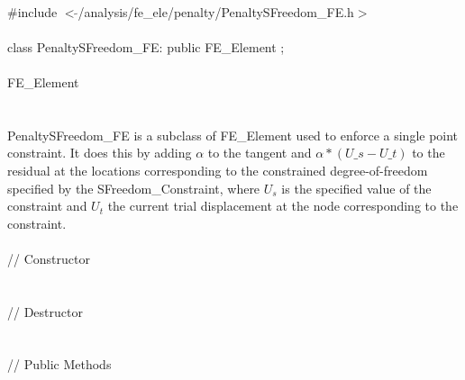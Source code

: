 
   \\
\indent \#include $<\tilde{ }$/analysis/fe\_ele/penalty/PenaltySFreedom\_FE.h$>$  \\

  \\
\indent class PenaltySFreedom\_FE: public FE\_Element ;  \\

  \\
\indent FE\_Element \\
\indent{} \\ 

  \\
\indent PenaltySFreedom\_FE is a subclass of FE\_Element used to enforce a
single point constraint. It does this by adding $\alpha$ to the
tangent and $\alpha * (U\_s - U\_t)$ to the residual at the locations
corresponding to the constrained degree-of-freedom specified by the
SFreedom\_Constraint, where $U_s$ is the specified value of the constraint
and $U_t$ the current trial displacement at the node corresponding to
the constraint.\\


  \\
\indent\indent // Constructor  \\
\indent{} \\ \\
\indent\indent // Destructor  \\
\indent{}  \\ \\
\indent\indent // Public Methods \\
\indent{} \\ 
\indent{} \\  
\indent{} \\ 
\indent{}\\

